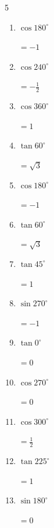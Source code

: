 \begin{multicols}{5}
\begin{enumerate}
        $\displaystyle =1$

  \item $\displaystyle \cos{180^\circ}$

        $\displaystyle =-1$

  \item $\displaystyle \cos{240^\circ}$

        $\displaystyle =-\frac{1}{2}$

  \item $\displaystyle \cos{360^\circ}$

        $\displaystyle =1$

  \item $\displaystyle \tan{60^\circ}$

        $\displaystyle =\sqrt{3}$

\columnbreak %

  \item $\displaystyle \cos{180^\circ}$

        $\displaystyle =-1$

  \item $\displaystyle \tan{60^\circ}$

        $\displaystyle =\sqrt{3}$

  \item $\displaystyle \tan{45^\circ}$

        $\displaystyle =1$

  \item $\displaystyle \sin{270^\circ}$

        $\displaystyle =-1$

  \item $\displaystyle \tan{0^\circ}$

        $\displaystyle =0$

  \item $\displaystyle \cos{270^\circ}$

        $\displaystyle =0$

  \item $\displaystyle \cos{300^\circ}$

        $\displaystyle =\frac{1}{2}$

  \item $\displaystyle \tan{225^\circ}$

        $\displaystyle =1$

  \item $\displaystyle \sin{180^\circ}$

        $\displaystyle =0$


\end{enumerate}
\end{multicols}
